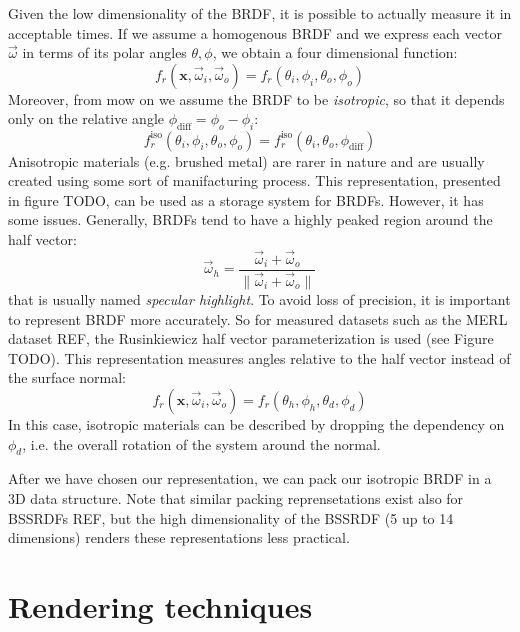 Given the low dimensionality of the BRDF, it is possible to actually measure it in acceptable times. If we assume a homogenous BRDF and we express each vector $\vec{\omega}$ in terms of its polar angles $\theta, \phi$, we obtain a four dimensional function:
\begin{equation*}
f_r(\mathbf{x}, \vec{\omega}_i,  \vec{\omega}_o) = f_r(\theta_i, \phi_i, \theta_o, \phi_o)
\end{equation*}
Moreover, from mow on we assume the BRDF to be \emph{isotropic}, so that it depends only on the relative angle $\phi_\text{diff} = \phi_o - \phi_i$:
\begin{equation*}
f_r^\text{iso}(\theta_i, \phi_i, \theta_o, \phi_o) = f_r^\text{iso}(\theta_i, \theta_o, \phi_\text{diff})
\end{equation*}
Anisotropic materials (e.g. brushed metal) are rarer in nature and are usually created using some sort of manifacturing process.
This representation, presented in figure TODO, can be used as a storage system for BRDFs. However, it has some issues. Generally, BRDFs tend to have a highly peaked region around the half vector:
\begin{equation*}\vec{\omega}_h = \frac{\vec{\omega}_i + \vec{\omega}_o}{\|\vec{\omega}_i + \vec{\omega}_o\|}
\end{equation*}
that is usually named \emph{specular highlight}. To avoid loss of precision, it is important to represent BRDF more accurately. So for measured datasets such as the MERL dataset REF, the Rusinkiewicz half vector parameterization is used (see Figure TODO). This representation measures angles relative to the half vector instead of the surface normal:
\begin{equation*}
f_r(\mathbf{x}, \vec{\omega}_i,  \vec{\omega}_o) = f_r(\theta_h, \phi_h, \theta_d, \phi_d)
\end{equation*}
In this case,  isotropic materials can be described by dropping the dependency on $\phi_d$, i.e. the overall rotation of the system around the normal.

After we have chosen our representation, we can pack our isotropic BRDF in a 3D data structure. Note that similar packing reprensetations exist also for BSSRDFs REF, but the high dimensionality of the BSSRDF (5 up to 14 dimensions) renders these representations less practical.

\section{Rendering techniques} 
\label{sec:renderingparadigms}

